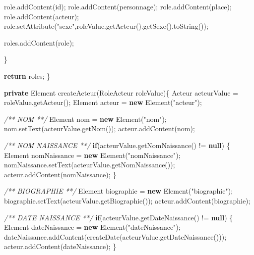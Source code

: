 \documentclass[]{article}
\newenvironment{Shaded}{}{}
\newcommand{\KeywordTok}[1]{\textcolor[rgb]{0.00,0.44,0.13}{\textbf{{#1}}}}
\newcommand{\StringTok}[1]{\textcolor[rgb]{0.25,0.44,0.63}{{#1}}}
\newcommand{\CommentTok}[1]{\textcolor[rgb]{0.38,0.63,0.69}{\textit{{#1}}}}
\newcommand{\FunctionTok}[1]{\textcolor[rgb]{0.02,0.16,0.49}{{#1}}}
\newcommand{\BuiltInTok}[1]{{#1}}
\newcommand{\NormalTok}[1]{{#1}}
\begin{document}
\begin{Shaded}
\begin{Highlighting}[]
		  \NormalTok{role.}\FunctionTok{addContent}\NormalTok{(id);}
		  \NormalTok{role.}\FunctionTok{addContent}\NormalTok{(personnage);}
		  \NormalTok{role.}\FunctionTok{addContent}\NormalTok{(place);}
		  \NormalTok{role.}\FunctionTok{addContent}\NormalTok{(acteur);}
		  \NormalTok{role.}\FunctionTok{setAttribute}\NormalTok{(}\StringTok{"sexe"}\NormalTok{,roleValue.}\FunctionTok{getActeur}\NormalTok{().}\FunctionTok{getSexe}\NormalTok{().}\FunctionTok{toString}\NormalTok{());}

		  \NormalTok{roles.}\FunctionTok{addContent}\NormalTok{(role);}

		\NormalTok{\}}

		\KeywordTok{return} \NormalTok{roles;}
	\NormalTok{\}}

	\KeywordTok{private} \BuiltInTok{Element} \FunctionTok{createActeur}\NormalTok{(RoleActeur roleValue)\{}
		\NormalTok{Acteur acteurValue = roleValue.}\FunctionTok{getActeur}\NormalTok{();}
		\BuiltInTok{Element} \NormalTok{acteur = }\KeywordTok{new} \BuiltInTok{Element}\NormalTok{(}\StringTok{"acteur"}\NormalTok{);}

		\CommentTok{/** NOM **/}
		\BuiltInTok{Element} \NormalTok{nom = }\KeywordTok{new} \BuiltInTok{Element}\NormalTok{(}\StringTok{"nom"}\NormalTok{);}
		\NormalTok{nom.}\FunctionTok{setText}\NormalTok{(acteurValue.}\FunctionTok{getNom}\NormalTok{());}
		\NormalTok{acteur.}\FunctionTok{addContent}\NormalTok{(nom);}

		\CommentTok{/** NOM NAISSANCE **/}
		\KeywordTok{if}\NormalTok{(acteurValue.}\FunctionTok{getNomNaissance}\NormalTok{() != }\KeywordTok{null}\NormalTok{) \{}
			\BuiltInTok{Element} \NormalTok{nomNaissance = }\KeywordTok{new} \BuiltInTok{Element}\NormalTok{(}\StringTok{"nomNaissance"}\NormalTok{);}
			\NormalTok{nomNaissance.}\FunctionTok{setText}\NormalTok{(acteurValue.}\FunctionTok{getNomNaissance}\NormalTok{());}
			\NormalTok{acteur.}\FunctionTok{addContent}\NormalTok{(nomNaissance);}
		\NormalTok{\}}

		\CommentTok{/** BIOGRAPHIE **/}
		\BuiltInTok{Element} \NormalTok{biographie = }\KeywordTok{new} \BuiltInTok{Element}\NormalTok{(}\StringTok{"biographie"}\NormalTok{);}
		\NormalTok{biographie.}\FunctionTok{setText}\NormalTok{(acteurValue.}\FunctionTok{getBiographie}\NormalTok{());}
		\NormalTok{acteur.}\FunctionTok{addContent}\NormalTok{(biographie);}

		\CommentTok{/** DATE NAISSANCE **/}
		\KeywordTok{if}\NormalTok{(acteurValue.}\FunctionTok{getDateNaissance}\NormalTok{() != }\KeywordTok{null}\NormalTok{) \{}
			\BuiltInTok{Element} \NormalTok{dateNaissance = }\KeywordTok{new} \BuiltInTok{Element}\NormalTok{(}\StringTok{"dateNaissance"}\NormalTok{);}
			\NormalTok{dateNaissance.}\FunctionTok{addContent}\NormalTok{(}\FunctionTok{createDate}\NormalTok{(acteurValue.}\FunctionTok{getDateNaissance}\NormalTok{()));}
			\NormalTok{acteur.}\FunctionTok{addContent}\NormalTok{(dateNaissance);}
		\NormalTok{\}}


\end{Highlighting}
\end{Shaded}
\end{document}
